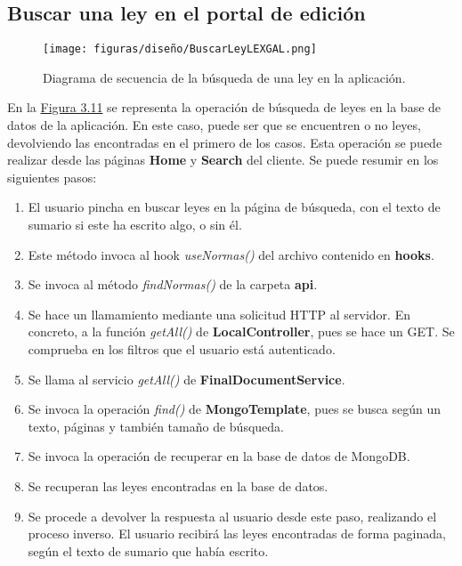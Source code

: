 \subsection{Buscar una ley en el portal de edición}

\begin{figure}[H]
\centerline{\texttt{[image: figuras/diseño/BuscarLeyLEXGAL.png]}}
\caption{Diagrama de secuencia de la búsqueda de una ley en la aplicación.}
\label{enlaceDBuscarLEXGALCuerpo}
\end{figure}

En la \hyperref[enlaceDBuscarLEXGALCuerpo]{Figura 3.11} se representa la operación de búsqueda de leyes en la base de datos de la aplicación. En este caso, puede ser que se encuentren o no leyes, devolviendo las encontradas en el primero de los casos. Esta operación se puede realizar desde las páginas {\bf Home} y {\bf Search} del cliente. Se puede resumir en los siguientes pasos:

\begin{enumerate}
    \item El usuario pincha en buscar leyes en la página de búsqueda, con el texto de sumario si este ha escrito algo, o sin él.
    \item Este método invoca al hook {\it useNormas()} del archivo contenido en {\bf hooks}.
    \item Se invoca al método {\it findNormas()} de la carpeta {\bf api}.
    \item Se hace un llamamiento mediante una solicitud HTTP al servidor. En concreto, a la función {\it getAll()} de {\bf LocalController}, pues se hace un GET. Se comprueba en los filtros que el usuario está autenticado.
    \item Se llama al servicio {\it getAll()} de {\bf FinalDocumentService}.
    \item Se invoca la operación {\it find()} de {\bf MongoTemplate}, pues se busca según un texto, páginas y también tamaño de búsqueda.
    \item Se invoca la operación de recuperar en la base de datos de MongoDB.
    \item Se recuperan las leyes encontradas en la base de datos.
    \item Se procede a devolver la respuesta al usuario desde este paso, realizando el proceso inverso. El usuario recibirá las leyes encontradas de forma paginada, según el texto de sumario que había escrito.
\end{enumerate}